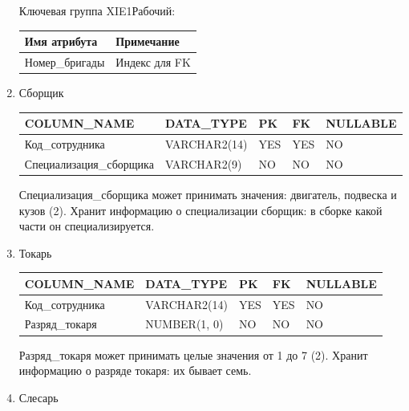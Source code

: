 \begin{enumerate}
    Ключевая группа XIE1Рабочий:

    \begin{tabular}{|p{7cm}|p{9.3cm}|} \hline

        {\bf Имя атрибута} & {\bf Примечание} \\ \hline
        Номер\_бригады & Индекс для FK \\ \hline

    \end{tabular}

    \item{Сборщик}

    \begin{tabular}{|p{7cm}|p{3cm}|p{1cm}|p{1cm}|p{3cm}|} \hline

        {\bf COLUMN\_NAME} & {\bf DATA\_TYPE} & {\bf PK} & {\bf FK} & {\bf NULLABLE} \\ \hline
        Код\_сотрудника & VARCHAR2(14) & YES & YES & NO \\ \hline
        Специализация\_сборщика & VARCHAR2(9) & NO & NO & NO \\ \hline

    \end{tabular}

    Специализация\_сборщика может принимать значения: двигатель, подвеска и кузов (2).
    Хранит информацию о специализации сборщик: в сборке какой части он специализируется.

    \item{Токарь}

    \begin{tabular}{|p{7cm}|p{3cm}|p{1cm}|p{1cm}|p{3cm}|} \hline

        {\bf COLUMN\_NAME} & {\bf DATA\_TYPE} & {\bf PK} & {\bf FK} & {\bf NULLABLE} \\ \hline
        Код\_сотрудника & VARCHAR2(14) & YES & YES & NO \\ \hline
        Разряд\_токаря & NUMBER(1, 0) & NO & NO & NO \\ \hline

    \end{tabular}

    Разряд\_токаря может принимать целые значения от 1 до 7 (2).
    Хранит информацию о разряде токаря: их бывает семь.

    \item{Слесарь}

    \begin{tabular}{|p{7cm}|p{3cm}|p{1cm}|p{1cm}|p{3cm}|} \hline


\end{tabular}
\end{enumerate}

